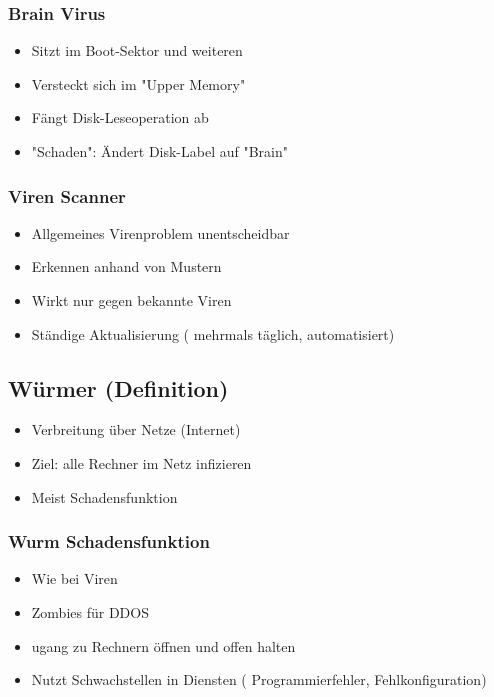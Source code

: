 {	\subsubsection*{Brain Virus}
	\begin{itemize}
		\item  Sitzt im Boot-Sektor und weiteren
		\item Versteckt sich im "Upper Memory"
		\item Fängt Disk-Leseoperation ab
		\item "Schaden": Ändert Disk-Label auf "Brain"
	\end{itemize}
	
	\subsubsection*{ Viren Scanner}
	\begin{itemize}
		\item Allgemeines Virenproblem unentscheidbar
		\item Erkennen anhand von Mustern
		\item Wirkt nur gegen bekannte Viren
		\item Ständige Aktualisierung ( mehrmals täglich, automatisiert)
	\end{itemize}
	
	\subsection*{ Würmer (Definition)}
	\begin{itemize}
		\item Verbreitung über Netze (Internet)
		\item Ziel: alle Rechner im Netz infizieren
		\item Meist Schadensfunktion
	\end{itemize}

\subsubsection*{ Wurm Schadensfunktion}
\begin{itemize}
	\item Wie bei Viren
	\item Zombies für DDOS
	\item ugang zu Rechnern öffnen und offen halten
	\item Nutzt Schwachstellen in Diensten ( Programmierfehler, Fehlkonfiguration)
\end{itemize}

}
